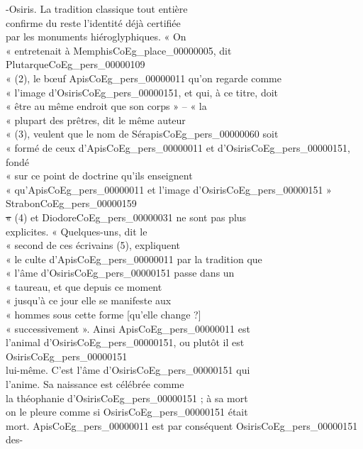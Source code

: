 \documentclass{book}
\begin{document}
{\begin{paracol}{2}
{-Osiris}. La tradition classique tout entière\\
confirme du reste l’identité déjà certifiée\\
par les monuments hiéroglyphiques. « On\\
« entretenait à Memphis\gls{CoEg_place_00000005}, dit Plutarque\gls{CoEg_pers_00000109}\\
« (2), le bœuf Apis\gls{CoEg_pers_00000011} qu’on regarde comme\\
« l’image d’Osiris\gls{CoEg_pers_00000151}, et qui, à ce titre, doit\\
« être au même endroit que son corps » – « la\\
« plupart des prêtres, dit le même auteur\\
« (3), veulent que le nom de Sérapis\gls{CoEg_pers_00000060} soit\\
« formé de ceux d’Apis\gls{CoEg_pers_00000011} et d’Osiris\gls{CoEg_pers_00000151}, fondé\\
« sur ce point de doctrine qu’ils enseignent\\
« qu’Apis\gls{CoEg_pers_00000011} et l’image d’Osiris\gls{CoEg_pers_00000151} » Strabon\gls{CoEg_pers_00000159}\\
\sout{«} (4) et Diodore\gls{CoEg_pers_00000031} ne sont pas plus\\
explicites. « Quelques-uns, dit le\\
« second de ces écrivains (5), expliquent\\
« le culte d’Apis\gls{CoEg_pers_00000011} par la tradition que\\
« l’âme d’Osiris\gls{CoEg_pers_00000151} passe dans un\\
« taureau, et que depuis ce moment\\
« jusqu’à ce jour elle se manifeste aux\\
« hommes sous cette forme [qu’elle change ?]\\
« successivement ». Ainsi Apis\gls{CoEg_pers_00000011} est\\
l’animal d’Osiris\gls{CoEg_pers_00000151}, ou plutôt il est Osiris\gls{CoEg_pers_00000151}\\
lui-même. C’est l’âme d’Osiris\gls{CoEg_pers_00000151} qui\\
l’anime. Sa naissance est célébrée comme\\
la théophanie d’Osiris\gls{CoEg_pers_00000151} ; à sa mort\\
on le pleure comme si Osiris\gls{CoEg_pers_00000151} était\\
mort. Apis\gls{CoEg_pers_00000011} est par conséquent Osiris\gls{CoEg_pers_00000151} des-\\

\end{paracol}}
\end{document}

